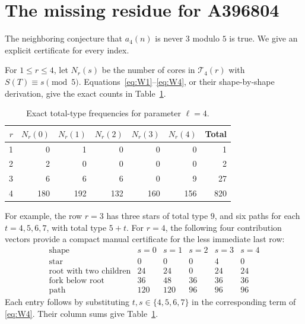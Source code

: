 \documentclass[11pt,letterpaper]{article}
\theoremstyle{definition}
\theoremstyle{remark}
\newcommand{\T}{\mathcal T}
\begin{document}
\section{The missing residue for A396804}\label{sec:avoidance}
The neighboring conjecture that $a_4(n)$ is never $3$ modulo $5$ is true.
We give an explicit certificate for every index.

For $1\le r\le4$, let $N_r(s)$ be the number of cores in $\T_4(r)$ with
$S(T)\equiv s\pmod5$. Equations~\eqref{eq:W1}--\eqref{eq:W4}, or their
shape-by-shape derivation, give the exact counts in
Table~\ref{tab:weights4}.
\begin{table}[ht]
\centering
\begin{tabular}{@{}rrrrrrr@{}}
\toprule
$r$ & $N_r(0)$ & $N_r(1)$ & $N_r(2)$ & $N_r(3)$ & $N_r(4)$ & Total\\
\midrule
1&0&1&0&0&0&1\\
2&2&0&0&0&0&2\\
3&6&6&6&0&9&27\\
4&180&192&132&160&156&820\\
\bottomrule
\end{tabular}
\caption{Exact total-type frequencies for parameter $\ell=4$.}
\label{tab:weights4}
\end{table}
For example, the row $r=3$ has three stars of total type $9$, and six
paths for each $t=4,5,6,7$, with total type $5+t$.
For $r=4$, the following four contribution vectors provide a compact
manual certificate for the less immediate last row:
\begin{equation}\label{eq:shape4vectors}
\begin{array}{c|rrrrr}
\text{shape}&s=0&s=1&s=2&s=3&s=4\\\hline
\text{star}&0&0&0&4&0\\
\text{root with two children}&24&24&0&24&24\\
\text{fork below root}&36&48&36&36&36\\
\text{path}&120&120&96&96&96
\end{array}
\end{equation}
Each entry follows by substituting $t,s\in\{4,5,6,7\}$ in the
corresponding term of \eqref{eq:W4}. Their column sums give
Table~\ref{tab:weights4}.
\end{document}
